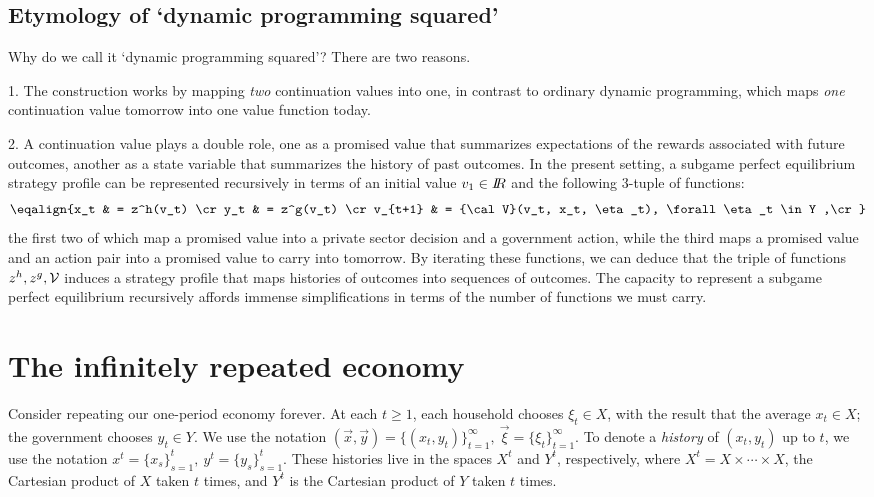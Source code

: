 \subsection{Etymology of `dynamic programming squared'}%
Why do we call it `dynamic programming squared'?  There are two reasons.
\medskip
\item{1.} The construction works by mapping {\it two} continuation values into one, in contrast to  ordinary
dynamic programming, which  maps {\it one} continuation value tomorrow into one value function today.
\item{2.}  A continuation value plays a double role, one as a promised value that summarizes expectations of the rewards associated with future
outcomes, another as a state variable that summarizes the history of past outcomes.  In the present setting, a subgame perfect
equilibrium strategy profile can be represented recursively in terms of an initial value $v_1 \in {I\kern-0.3em R}$ and  the following 3-tuple of functions:
$$ \eqalign{x_t & = z^h(v_t)  \cr
         y_t & = z^g(v_t) \cr
   v_{t+1} & = {\cal V}(v_t, x_t, \eta_t), \forall \eta_t \in Y  ,\cr
             }
$$
the first two of which map
a promised value into a private sector decision and a government action, while the third maps a promised value and an action pair into a promised value to carry into tomorrow.  By iterating these functions, we can deduce that
the triple of functions $z^h, z^g, {\cal V}$ induces a strategy profile that maps histories of outcomes into sequences of outcomes.  The capacity to represent a subgame perfect equilibrium
recursively affords immense simplifications in terms of the number of functions we must carry.


\medskip
\section{The infinitely repeated economy}

Consider repeating our one-period economy
forever.  At each $t\geq 1$, each household chooses $\xi_t\in X$,
with the result that the average $x_t\in X$; the government
chooses $y_t\in Y$.  We use the notation $(\vec{x},\vec{y}) =
\{(x_t,y_t)\}^\infty_{t=1},\ \vec{\xi} =\{\xi_t\}^\infty_{t=1}$.
To denote a {\it history\/} of $(x_t,y_t)$ up to $t$, we use the
notation $x^t=\{x_s\}^t_{s=1},\ y^t=\{y_s\}^t_{s=1}$.  These
histories live in the spaces $X^t$ and $Y^t$, respectively, where
$X^t=X \times\cdots \times X$, the Cartesian product of $X$ taken
$t$ times, and $Y^t$ is the Cartesian product of $Y$ taken $t$
times.

